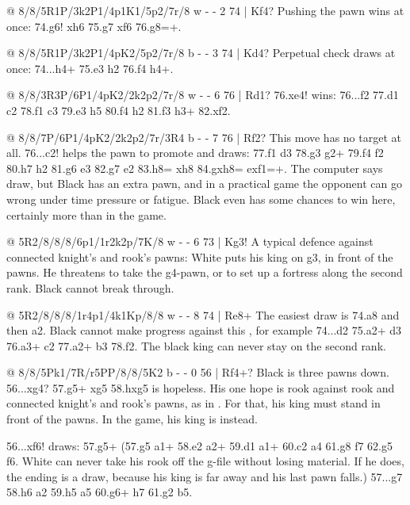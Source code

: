 @ 8/8/5R1P/3k2P1/4p1K1/5p2/7r/8 w - - 2 74 | Kf4?
Pushing the pawn wins at once: 74.g6! \R xh6 75.g7 \R xf6 76.g8=\Q+.

@ 8/8/5R1P/3k2P1/4pK2/5p2/7r/8 b - - 3 74 | Kd4?
Perpetual check draws at once: 74...\R h4+ 75.\K e3 \R h2 76.\K f4 \R h4+.

@ 8/8/3R3P/6P1/4pK2/2k2p2/7r/8 w - - 6 76 | Rd1?
76.\K xe4! wins: 76...f2 77.\R d1 \K c2 78.\R f1 \K c3 79.\K e3 \R h5 80.\K f4 \R h2 81.\K f3
\R h3+ 82.\K xf2.

@ 8/8/7P/6P1/4pK2/2k2p2/7r/3R4 b - - 7 76 | Rf2?
This move has no target at all. 76...\K c2! helps the pawn to promote and draws: 77.\R f1 \K d3
78.\K g3 \R g2+ 79.\K f4 f2 80.h7 \R h2 81.g6 e3 82.g7 e2 83.h8=\Q{} \R xh8 84.gxh8=\Q{} exf1=\Q+.
The computer says draw, but Black has an extra pawn, and in a practical game the opponent can
go wrong under time pressure or fatigue. Black even has some chances to win here, certainly more
than in the game.

@ 5R2/8/8/8/6p1/1r2k2p/7K/8 w - - 6 73 | Kg3!
A typical defence against connected knight's and rook's pawns: White puts his king on g3, in
front of the pawns. He threatens to take the g4-pawn, or to set up a fortress along the second
rank. Black cannot break through.

@ 5R2/8/8/8/1r4p1/4k1Kp/8/8 w - - 8 74 | Re8+
The easiest draw is 74.\R a8 and then \R a2. Black cannot make progress against this
,
for example 74...\K d2 75.\R a2+ \K d3 76.\R a3+ \K c2 77.\R a2+ \K b3 78.\R f2. The black king
can never stay on the second rank.

@ 8/8/5Pk1/7R/r5PP/8/8/5K2 b - - 0 56 | Rf4+?
Black is three pawns down. 56...\R xg4? 57.\R g5+ \R xg5 58.hxg5 is hopeless. His one hope is
rook against rook and connected knight's and rook's pawns, as in
. For that,
his king must stand in front of the pawns. In the game, his king is 
instead.

56...\K xf6! draws: 57.g5+ (57.\R g5 \R a1+ 58.\K e2 \R a2+ 59.\K d1 \R a1+ 60.\K c2 \R a4
61.\R g8 \K f7 62.\R g5 \K f6. White can never take his rook off the g-file without losing
material. If he does, the ending is a draw, because his king is far away and his last pawn
falls.) 57...\K g7 58.\R h6 \R a2 59.h5 \R a5 60.\R g6+ \K h7 61.\K g2 \R b5.

